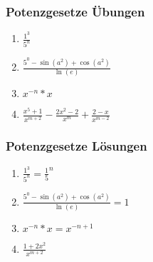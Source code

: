 \begin{frame}
    \frametitle{Potenzgesetze Übungen}
	\begin{enumerate}
		\vfill \item $\frac{1^3}{5^n}$
		\vfill \item $\frac{5^0- \sin(a^2) + \cos(a^2)}{\ln(e)}$
		\vfill \item $x^{-n} * x$
		\vfill \item $\frac{x^5 +1}{x^{m+2}} - \frac{2x^2-2}{x^m} + \frac{2-x}{x^{m-2}}$
	\end{enumerate}
\end{frame}

\begin{frame}
    \frametitle{Potenzgesetze Lösungen}
	\begin{enumerate}
		\vfill \item $\frac{1^3}{5^n} = \frac{1}{5}^n$
		\vfill \item $\frac{5^0- \sin(a^2) + \cos(a^2)}{\ln(e)} = 1$
		\vfill \item $x^{-n} * x = x^{-n+1}$
		\vfill \item $\frac{1+2x^2}{x^{m+2}}$
	\end{enumerate}
\end{frame}
